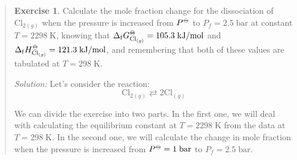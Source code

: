 \documentclass[
]{book}
\theoremstyle{definition}
\theoremstyle{definition}
\theoremstyle{definition}
\newtheorem{exercise}{Exercise}[chapter]
\theoremstyle{remark}
\begin{document}
\begin{quote}
\begin{exercise}
\protect\hypertarget{exr:kpkx}{}{\label{exr:kpkx} }Calculate the mole fraction change for the dissociation of \(\mathrm{Cl}_{2(g)}\) when the pressure is increased from \(P^{-\kern-6pt{\ominus}\kern-6pt-}\) to \(P_f=2.5 \;\text{bar}\) at constant \(T=2298\;\mathrm{K}\), knowing that \(\Delta_{\mathrm{f}} G^{-\kern-6pt{\ominus}\kern-6pt-}_{\mathrm{Cl}_{(g)}} = 105.3 \;\text{kJ/mol}\) and \(\Delta_{\mathrm{f}} H^{-\kern-6pt{\ominus}\kern-6pt-}_{\mathrm{Cl}_{(g)}} = 121.3 \;\text{kJ/mol}\), and remembering that both of these values are tabulated at \(T=298\;\text{K}\).

\emph{Solution:} Let's consider the reaction:
\[
\mathrm{Cl}_{2(g)} \rightleftarrows 2 \mathrm{Cl}_{(g)}
\]

We can divide the exercise into two parts. In the first one, we will deal with calculating the equilibrium constant at \(T=2298\;\mathrm{K}\) from the data at \(T=298\;\mathrm{K}\). In the second one, we will calculate the change in mole fraction when the pressure is increased from \(P^{-\kern-6pt{\ominus}\kern-6pt-}=1\;\text{bar}\) to \(P_f=2.5 \;\text{bar}\).


\end{exercise}
\end{quote}
\end{document}
